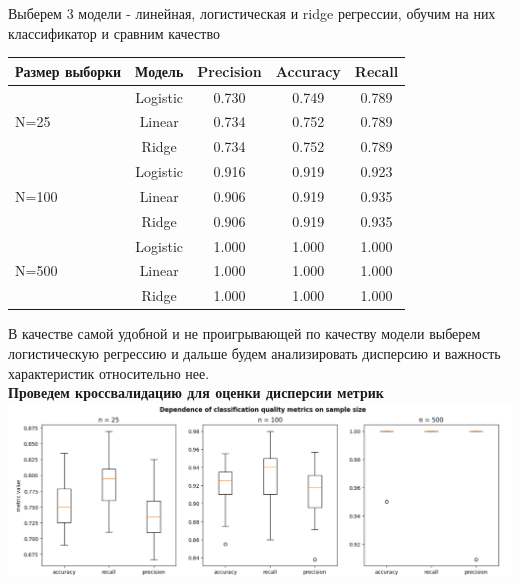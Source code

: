 Выберем 3 модели - линейная, логистическая и ridge регрессии, обучим на них классификатор и сравним качество
\begin{table}[h]
\centering
\begin{tabular}{lcccc}
\toprule
\textbf{Размер выборки} & \textbf{Модель} & \textbf{Precision} & \textbf{Accuracy} & \textbf{Recall} \\
\midrule
\multirow{3}{*}{N=25} 
 & Logistic & 0.730 & 0.749 & 0.789 \\
 & Linear & 0.734 & 0.752 & 0.789 \\
 & Ridge & 0.734 & 0.752 & 0.789 \\
\midrule
\multirow{3}{*}{N=100}
 & Logistic & 0.916 & 0.919 & 0.923 \\
 & Linear & 0.906 & 0.919 & 0.935 \\
 & Ridge & 0.906 & 0.919 & 0.935 \\
\midrule
\multirow{3}{*}{N=500}
 & Logistic & 1.000 & 1.000 & 1.000 \\
 & Linear & 1.000 & 1.000 & 1.000 \\
 & Ridge & 1.000 & 1.000 & 1.000 \\
\bottomrule
\end{tabular}
\end{table}

\noindent В качестве самой удобной и не проигрывающей по качеству модели выберем логистическую регрессию и дальше будем анализировать дисперсию и важность характеристик относительно нее.\\


\textbf{Проведем кроссвалидацию для оценки дисперсии метрик}\\

\hspace*{-1cm}
\includegraphics[width=1\textwidth]{Part-II-Ivanova/dispers.png}\\ 



